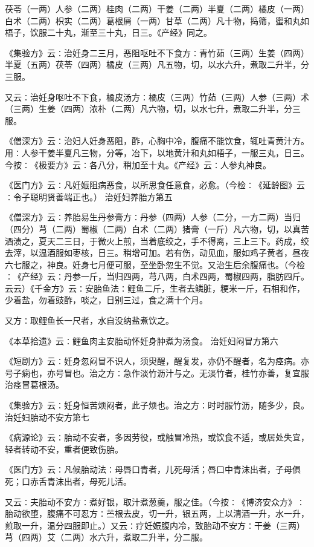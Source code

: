 \documentclass[a4paper,12pt,UTF8,twoside]{ctexbook}
\begin{document}
茯苓（一两）人参（二两）桂肉（二两）干姜（二两）半夏（二两）橘皮（一两）白术（二两）枳实（二两）葛根屑（一两）甘草（二两）凡十物，捣筛，蜜和丸如梧子，饮服二十丸，渐至三十丸，日三。《产经》同之。

《集验方》云∶治妊身二三月，恶阻呕吐不下食方∶青竹茹（三两）生姜（四两）半夏（五两）茯苓（四两）橘皮（三两）凡五物，切，以水六升，煮取二升半，分三服。

又云∶治妊身呕吐不下食，橘皮汤方∶橘皮（三两）竹茹（三两）人参（三两）术（三两）生姜（四两）浓朴（二两）凡六物，切，以水七升，煮取二升半，分三服。

《僧深方》云∶治妇人妊身恶阻，酢，心胸中冷，腹痛不能饮食，辄吐青黄汁方。用∶人参干姜半夏凡三物，分等，冶下，以地黄汁和丸如梧子，一服三丸，日三。今按∶《极要方》云∶各八分，稍加至十丸。《产经》云∶人参丸神良。

《医门方》云∶凡妊娠阻病恶食，以所思食任意食，必愈。（今检∶《延龄图》云∶令子聪明贤善端正也。）
治妊妇养胎方第五

《僧深方》云∶养胎易生丹参膏方∶丹参（四两）人参（二分，一方二两）当归（四分）芎（二两）蜀椒（二两）白术（二两）猪膏（一斤）凡六物，切，以真苦酒渍之，夏天二三日，于微火上煎，当着底绞之，手不得离，三上三下。药成，绞去滓，以温酒服如枣核，日三。稍增可加。若有伤，动见血，服如鸡子黄者，昼夜六七服之，神良。妊身七月便可服，至坐卧忽生不觉。又治生后余腹痛也。（今检∶《产经》云∶丹参一斤，当归四两，芎八两，白术四两，蜀椒四两，脂肪四斤。云云）《千金方》云∶安胎鱼法∶鲤鱼二斤，生者去鳞脏，粳米一斤，石相和作，少着盐，勿着豉酢，啖之，日别三过，食之满十个月。

又方∶取鲤鱼长一尺者，水自没纳盐煮饮之。

《本草拾遗》云∶鲤鱼肉主安胎动怀妊身肿煮为汤食。
治妊妇闷冒方第六

《短剧方》云∶妊身忽闷冒不识人，须臾醒，醒复发，亦仍不醒者，名为痉病。亦号子痫也，亦号冒也。治之方∶急作淡竹沥汁与之。无淡竹者，桂竹亦善，复宜服治痉冒葛根汤。

《集验方》云∶妊身恒苦烦闷者，此子烦也。治之方∶时时服竹沥，随多少，良。
治妊妇胎动不安方第七

《病源论》云∶胎动不安者，多因劳役，或触冒冷热，或饮食不适，或居处失宜，轻者转动不安，重者便致伤胎。

《医门方》云∶凡候胎动法∶母唇口青者，儿死母活；唇口中青沫出者，子母俱死；口赤舌青沫出者，母死儿活。

又云∶夫胎动不安方∶煮好银，取汁煮葱羹，服之佳。（今按∶《博济安众方》∶胎动欲堕，腹痛不可忍方∶苎根去皮，切一升，银五两，上以清酒一升，水一升，煎取一升，温分四服即止。）又云∶疗妊娠腹内冷，致胎动不安方∶干姜（三两）芎（四两）艾（二两）水六升，煮取二升半，分二服。
\end{document}
